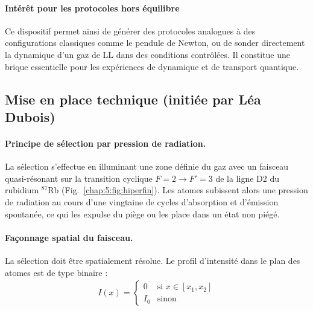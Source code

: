 \paragraph{Intérêt pour les protocoles hors équilibre}

Ce dispositif permet ainsi de générer des protocoles analogues à des configurations classiques comme le pendule de Newton, ou de sonder directement la dynamique d’un gaz de \gls{LL} dans des conditions contrôlées. Il constitue une brique essentielle pour les expériences de dynamique et de transport quantique.


\subsection{Mise en place technique (initiée par Léa Dubois)}


\paragraph{Principe de sélection par pression de radiation.}

La sélection s’effectue en illuminant une zone définie du gaz avec un faisceau quasi-résonant sur la transition cyclique \( F=2 \rightarrow F'=3 \) de la ligne D2 du rubidium $^{87}$Rb (Fig.~\ref{chap:5:fig:hiperfin}). Les atomes subissent alors une pression de radiation au cours d’une vingtaine de cycles d’absorption et d’émission spontanée, ce qui les expulse du piège ou les place dans un état non piégé.


\paragraph{Façonnage spatial du faisceau.}

La sélection doit être spatialement résolue. Le profil d’intensité dans le plan des atomes est de type binaire :
\begin{eqnarray*}
	I(x) = 
		\begin{cases}
			0 & \text{si } x \in [x_1, x_2] \\
			I_0 & \text{sinon}
		\end{cases}	
\end{eqnarray*}

